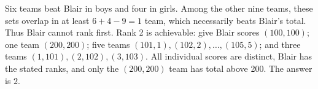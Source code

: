 Six teams beat Blair in boys and four in girls. Among the other nine teams, these sets overlap in at least $ 6+4-9=1 $ team, which necessarily beats Blair's total. Thus Blair cannot rank first. Rank 2 is achievable: give Blair scores $(100,100)$; one team $(200,200)$; five teams $(101,1),(102,2),\ldots,(105,5)$; and three teams $(1,101),(2,102),(3,103)$. All individual scores are distinct, Blair has the stated ranks, and only the $(200,200)$ team has total above 200. The answer is $\boxed2 $.
